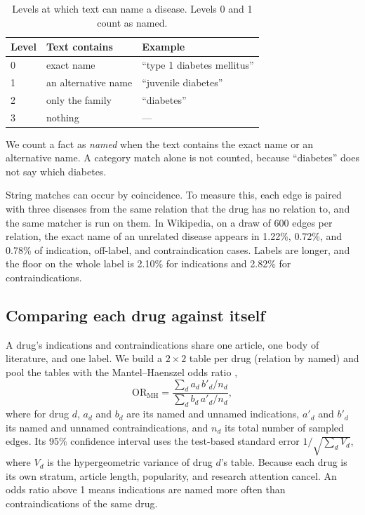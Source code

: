 \documentclass[letterpaper]{article} %
\begin{document}
\begin{table}[t]
\centering
\small
\setlength{\tabcolsep}{4pt}
\begin{tabular}{lll}
\toprule
Level & Text contains & Example \\
\midrule
0 & exact name & ``type 1 diabetes mellitus'' \\
1 & an alternative name & ``juvenile diabetes'' \\
2 & only the family & ``diabetes'' \\
3 & nothing & --- \\
\bottomrule
\end{tabular}
\caption{Levels at which text can name a disease. Levels 0 and 1 count as named.}
\label{tab:levels}
\end{table}

We count a fact as \emph{named} when the text contains the exact name or an
alternative name. A category match alone is not counted, because ``diabetes''
does not say which diabetes.

String matches can occur by coincidence. To measure this, each edge is paired
with three diseases from the same relation that the drug has no relation to,
and the same matcher is run on them. In Wikipedia, on a draw of 600 edges per
relation, the exact name of an unrelated disease appears in 1.22\%, 0.72\%,
and 0.78\% of indication, off-label, and contraindication cases. Labels are
longer, and the floor on the whole label is 2.10\% for indications and 2.82\%
for contraindications.

\subsection{Comparing each drug against itself}

A drug's indications and contraindications share one article, one body of
literature, and one label. We build a $2\times2$ table per drug (relation by
named) and pool the tables with the Mantel--Haenszel odds ratio
\citep{mantel1959},
\begin{equation}
\mathrm{OR}_{\mathrm{MH}} = \frac{\sum_d a_d\, b'_d / n_d}{\sum_d b_d\, a'_d / n_d},
\end{equation}
where for drug $d$, $a_d$ and $b_d$ are its named and unnamed indications,
$a'_d$ and $b'_d$ its named and unnamed contraindications, and $n_d$ its total
number of sampled edges. Its 95\% confidence interval uses the test-based
standard error $1/\sqrt{\sum_d V_d}$, where $V_d$ is the hypergeometric
variance of drug $d$'s table. Because each drug is its own stratum, article
length, popularity, and research attention cancel. An odds ratio above 1 means
indications are named more often than contraindications of the same drug.
\end{document}
